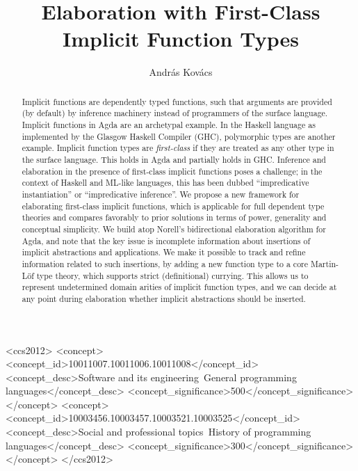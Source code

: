 \documentclass[acmsmall,review,anonymous,prologue,dvipsnames]{acmart}\settopmatter{printfolios=true,printccs=false,printacmref=false}
\theoremstyle{remark}
\begin{document}
\title{Elaboration with First-Class Implicit Function Types}


\author{Andr{\'a}s Kov{\'a}cs}


\begin{abstract}
Implicit functions are dependently typed functions, such that arguments are
provided (by default) by inference machinery instead of programmers of the
surface language. Implicit functions in Agda are an archetypal example. In the
Haskell language as implemented by the Glasgow Haskell Compiler (GHC),
polymorphic types are another example. Implicit function types are
\emph{first-class} if they are treated as any other type in the surface
language. This holds in Agda and partially holds in GHC. Inference and
elaboration in the presence of first-class implicit functions poses a challenge;
in the context of Haskell and ML-like languages, this has been dubbed
``impredicative instantiation'' or ``impredicative inference''. We propose a new
framework for elaborating first-class implicit functions, which is applicable
for full dependent type theories and compares favorably to prior solutions in
terms of power, generality and conceptual simplicity. We build atop Norell's
bidirectional elaboration algorithm for Agda, and note that the key issue is
incomplete information about insertions of implicit abstractions and
applications. We make it possible to track and refine information related to
such insertions, by adding a new function type to a core Martin-L\"of type
theory, which supports strict (definitional) currying. This allows us to
represent undetermined domain arities of implicit function types, and we can
decide at any point during elaboration whether implicit abstractions should be
inserted.
\end{abstract}


\begin{CCSXML}
<ccs2012>
<concept>
<concept_id>10011007.10011006.10011008</concept_id>
<concept_desc>Software and its engineering~General programming languages</concept_desc>
<concept_significance>500</concept_significance>
</concept>
<concept>
<concept_id>10003456.10003457.10003521.10003525</concept_id>
<concept_desc>Social and professional topics~History of programming languages</concept_desc>
<concept_significance>300</concept_significance>
</concept>
</ccs2012>
\end{CCSXML}
\end{document}
